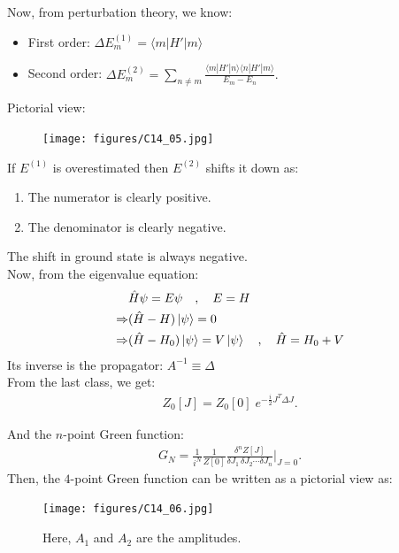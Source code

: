 \documentclass[14pt]{article} %
\begin{document}
Now, from perturbation theory, we know:
\begin{itemize}
    \item First order: $\Delta E_m^{(1)} = \langle m | H' | m \rangle$
    \item Second order: $\Delta E_m^{(2)} = \sum_{n \neq m} \frac{\langle m | H' | n \rangle \langle n | H' | m \rangle}{E_m - E_n}.$
\end{itemize}
Pictorial view:
\begin{figure}[H]
    \centering
    \texttt{[image: figures/C14\_05.jpg]}
    \caption*{}
\end{figure}
\vspace{-1cm}
If $E^{(1)}$ is overestimated then $E^{(2)}$ shifts it down as:
\begin{enumerate}
    \item The numerator is clearly positive.
    \item The denominator is clearly negative.
\end{enumerate}
The shift in ground state is always negative.\\

Now, from the eigenvalue equation:
\begin{align*}
&\hat{H} \psi = E \psi \quad, \quad E = H \\
\Rightarrow & (\hat{H} - H) \ket{\psi} =0
\\
\Rightarrow &(\hat{H} - H_0) \ket{\psi} = V \ket{\psi} \quad, \quad \hat{H} = H_0 + V
\end{align*}
Its inverse is the propagator: $A^{-1} \equiv \Delta$
\\

From the last class, we get:
\begin{align*}
Z_0[J] = Z_0[0] \; e^{-\frac{i}{2} J^T \Delta J}.
\end{align*}

And the $n$-point Green function:
\begin{align*}
G_N = \frac{1}{i^N} \frac{1}{Z[0]} \frac{\delta^n Z[J]}{\delta J_1 \, \delta J_2 \cdots \delta J_n} \Bigg|_{J=0}.
\end{align*}
Then, the $4$-point Green function can be written as a pictorial view as:
\begin{figure}[H]
    \centering
    \texttt{[image: figures/C14\_06.jpg]}
    \caption*{Here, $A_1$ and $A_2$ are the amplitudes.}
\end{figure}
\end{document}
